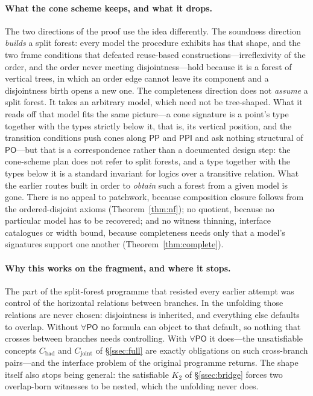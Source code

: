 \documentclass[11pt]{article}
\newcommand{\PO}{\mathsf{PO}}
\newcommand{\PP}{\mathsf{PP}}
\newcommand{\PPI}{\mathsf{PPI}}
\theoremstyle{plain}
\theoremstyle{definition}
\begin{document}
\paragraph{What the cone scheme keeps, and what it drops.} The two directions
of the proof use the idea differently. The soundness direction \emph{builds} a
split forest: every model the procedure exhibits has that shape, and the two
frame conditions that defeated reuse-based constructions---irreflexivity of the
order, and the order never meeting disjointness---hold because it is a forest
of vertical trees, in which an order edge cannot leave its component and a
disjointness birth opens a new one. The completeness direction does not
\emph{assume} a split forest. It takes an arbitrary model, which need not be
tree-shaped. What it reads off that model fits the same picture---a cone
signature is a point's type together with the types strictly below it, that
is, its vertical position, and the transition conditions push cones along $\PP$
and $\PPI$ and ask nothing structural of $\PO$---but that is a correspondence
rather than a documented design step: the cone-scheme plan does not refer to
split forests, and a type together with the types below it is a standard
invariant for logics over a transitive relation. What the earlier routes built in order to \emph{obtain} such a forest
from a given model is gone. There is no appeal to patchwork, because
composition closure follows from the ordered-disjoint axioms
(Theorem~\ref{thm:nf}); no quotient, because no particular model has to be
recovered; and no witness thinning, interface catalogues or width bound,
because completeness needs only that a model's signatures support one another
(Theorem~\ref{thm:complete}).

\paragraph{Why this works on the fragment, and where it stops.} The part of the
split-forest programme that resisted every earlier attempt was control of the
horizontal relations between branches. In the unfolding those relations are
never chosen: disjointness is inherited, and everything else defaults to
overlap. Without $\forall\PO$ no formula can object to that default, so nothing
that crosses between branches needs controlling. With $\forall\PO$ it does---the
unsatisfiable concepts $C_{\mathrm{bad}}$ and $C_{\mathrm{joint}}$ of
\S\ref{ssec:full} are exactly obligations on such cross-branch pairs---and the
interface problem of the original programme returns. The shape itself also
stops being general: the satisfiable $K_2$ of \S\ref{ssec:bridge} forces two
overlap-born witnesses to be nested, which the unfolding never does.
\end{document}
